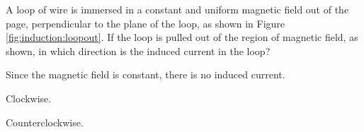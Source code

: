 \begin{checkpoint}{}\label{induction:checkpoint:movingloop}
	\begin{MCquestion}{A loop of wire is immersed in a constant and uniform magnetic field out of the page, perpendicular to the plane of the loop, as shown in Figure \ref{fig:induction:loopout}. If the loop is pulled out of the region of magnetic field, as shown, in which direction is the induced current in the loop?
	}
		\item Since the magnetic field is constant, there is no induced current.
		\item Clockwise. 
		\item Counterclockwise.\correct 
	\end{MCquestion}
\end{checkpoint}

